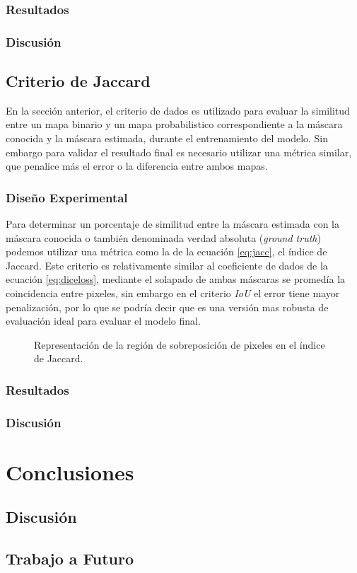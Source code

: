 \subsection{Resultados}
\subsection{Discusión}

\section{Criterio de Jaccard}
En la sección anterior, el criterio de dados es utilizado para evaluar la similitud entre un mapa binario y un mapa probabilistico correspondiente a la máscara conocida y la máscara estimada, durante el entrenamiento del modelo. Sin embargo para validar el resultado final es necesario utilizar una métrica similar, que penalice más el error o la diferencia entre ambos mapas.

\subsection{Diseño Experimental}
Para determinar un porcentaje de similitud entre la máscara estimada con la máscara conocida o también denominada verdad absoluta (\emph{ground truth}) podemos utilizar una métrica como la de la ecuación \ref{eq:jacc}, el índice de Jaccard. Este criterio es relativamente similar al coeficiente de dados de la ecuación \ref{eq:diceloss}, mediante el solapado de ambas máscaras se promedía la coincidencia entre pixeles, sin embargo en el criterio \emph{IoU} el error tiene mayor penalización, por lo que se podría decir que es una versión mas robusta de evaluación ideal para evaluar el modelo final.

\def\rectA{(0,0) rectangle (2,2)}
\def\rectB{(1,-1) rectangle (3,1)}

\begin{figure}[h]
    \centering
    \caption{Representación de la región de sobreposición de pixeles en el índice de Jaccard.}
\end{figure}


\subsection{Resultados}
\subsection{Discusión}


\chapter{Conclusiones}
\section{Discusión}

\section{Trabajo a Futuro}

\nocite{*}